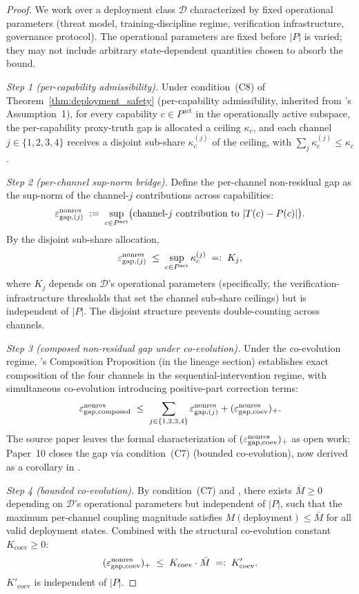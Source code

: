 \begin{proof}
We work over a deployment class $\mathcal{D}$ characterized by
fixed operational parameters (threat model, training-discipline
regime, verification infrastructure, governance protocol).  The
operational parameters are fixed before $|P|$ is varied; they may
not include arbitrary state-dependent quantities chosen to absorb
the bound.

\emph{Step 1 (per-capability admissibility).}  Under
condition~(C8) of Theorem~\ref{thm:deployment_safety} (per-capability
admissibility, inherited from
\citep[Microfoundation]{lasser2026micro}'s Assumption~1), for every
capability $c \in P^{\mathrm{act}}$ in the operationally active
subspace, the per-capability proxy-truth gap is allocated a ceiling
$\kappa_c$, and each channel $j \in \{1, 2, 3, 4\}$ receives a
disjoint sub-share $\kappa_c^{(j)}$ of the ceiling, with
$\sum_j \kappa_c^{(j)} \leq \kappa_c$.

\emph{Step 2 (per-channel sup-norm bridge).}  Define the per-channel
non-residual gap as the sup-norm of the channel-$j$ contributions
across capabilities:
\[
  \varepsilon_{\mathrm{gap},(j)}^{\mathrm{nonres}} \;:=\; \sup_{c \in P^{\mathrm{act}}}
  \bigl(\text{channel-}j\text{ contribution to } |T(c) - P(c)|\bigr).
\]
By the disjoint sub-share allocation,
\[
  \varepsilon_{\mathrm{gap},(j)}^{\mathrm{nonres}} \;\leq\; \sup_{c \in P^{\mathrm{act}}}
  \kappa_c^{(j)} \;=:\; K_j,
\]
where $K_j$ depends on $\mathcal{D}$'s operational parameters
(specifically, the verification-infrastructure thresholds that set
the channel sub-share ceilings) but is independent of $|P|$. The
disjoint structure prevents double-counting across channels.

\emph{Step 3 (composed non-residual gap under co-evolution).}
Under the co-evolution regime, \citep[Microfoundation]{lasser2026micro}'s
Composition Proposition (in the lineage section) establishes
exact composition of the four channels in the sequential-intervention
regime, with simultaneous co-evolution introducing positive-part
correction terms:
\[
  \varepsilon_{\mathrm{gap},\mathrm{composed}}^{\mathrm{nonres}} \;\leq\; \sum_{j \in \{1, 2, 3, 4\}}
  \varepsilon_{\mathrm{gap},(j)}^{\mathrm{nonres}} + (\varepsilon_{\mathrm{gap},\mathrm{coev}}^{\mathrm{nonres}})_+.
\]
The source paper leaves the formal characterization of
$(\varepsilon_{\mathrm{gap},\mathrm{coev}}^{\mathrm{nonres}})_+$ as open work; Paper~10 closes the gap via
condition~(C7) (bounded co-evolution), now derived as a
corollary in \citep[Theorem~1]{lasser2026foundations}.

\emph{Step 4 (bounded co-evolution).}  By condition~(C7) and
\citep[Theorem~1]{lasser2026foundations}, there exists
$\bar{M} \geq 0$ depending on $\mathcal{D}$'s operational parameters
but independent of $|P|$, such that the maximum per-channel
coupling magnitude satisfies $M(\text{deployment}) \leq \bar{M}$
for all valid deployment states.  Combined with the structural
co-evolution constant $K_{\mathrm{coev}} \geq 0$:
\[
  (\varepsilon_{\mathrm{gap},\mathrm{coev}}^{\mathrm{nonres}})_+ \;\leq\; K_{\mathrm{coev}} \cdot \bar{M}
  \;=:\; K'_{\mathrm{coev}}.
\]
$K'_{\mathrm{coev}}$ is independent of $|P|$.


\end{proof}
